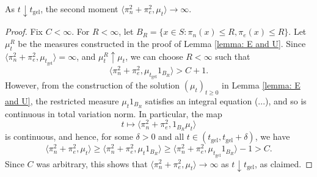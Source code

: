 \begin{lemma} As $t\downarrow t_\text{gel}$, the second moment $\langle \pi_n^2+\pi_e^2, \mu_t\rangle \rightarrow \infty$.  \end{lemma} \begin{proof} Fix $C<\infty$. For $R<\infty$, let $B_R=\{x\in S: \pi_n(x)\leq R, \pi_e(x) \leq R\}$. Let $\mu^R_t$ be the measures constructed in the proof of Lemma \ref{lemma: E and U}. Since $\langle \pi_n^2 + \pi_e^2, \mu_{t_\text{gel}}\rangle =\infty$, and $\mu^R_t\uparrow \mu_t$, we can choose $R<\infty$ such that \begin{equation}
    \langle \pi_n^2+\pi_e^2, \mu_{t_\text{gel}}1_{B_R}\rangle >C+1.
\end{equation} However, from the construction of the solution $(\mu_t)_{t\geq 0}$ in Lemma \ref{lemma: E and U}, the restricted measure $\mu_t1_{B_R}$ satisfies an integral equation (...), and so is continuous in total variation norm. In particular, the map \begin{equation}
    t\mapsto \langle \pi_n^2+\pi_e^2, 1_{B_R}\mu_t\rangle
\end{equation} is continuous, and hence, for some $\delta>0$ and all $t\in(t_\text{gel}, t_\text{gel}+\delta)$, we have \begin{equation}
    \langle \pi_n^2+\pi_e^2, \mu_t\rangle \geq \langle \pi_n^2+\pi_e^2, \mu_t1_{B_R}\rangle \geq \langle \pi_n^2+\pi_e^2, \mu_{t_\text{gel}}1_{B_R}\rangle -1 >C.
\end{equation}Since $C$ was arbitrary, this shows that $\langle \pi_n^2+\pi_e^2, \mu_t\rangle \rightarrow \infty$ as $t\downarrow t_\text{gel}$, as claimed.\end{proof}